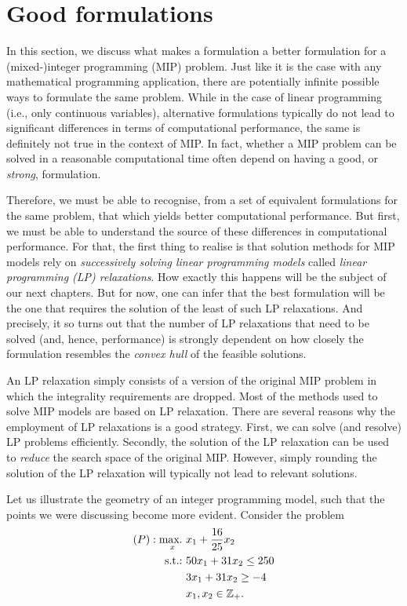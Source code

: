   
\section{Good formulations}

In this section, we discuss what makes a formulation a better formulation for a (mixed-)integer programming (MIP) problem. Just like it is the case with any mathematical programming application, there are potentially infinite possible ways to formulate the same problem. While in the case of linear programming (i.e., only continuous variables), alternative formulations typically do not lead to significant differences in terms of computational performance, the same is definitely not true in the context of MIP. In fact, whether a MIP problem can be solved in a reasonable computational time often depend on having a good, or \emph{strong}, formulation.

Therefore, we must be able to recognise, from a set of equivalent formulations for the same problem, that which yields better computational performance. But first, we must be able to understand the source of these differences in computational performance. For that, the first thing to realise is that solution methods for MIP models rely on \emph{successively solving linear programming models} called \emph{linear programming (LP) relaxations}. How exactly this happens will be the subject of our next chapters. But for now, one can infer that the best formulation will be the one that requires the solution of the least of such LP relaxations. And precisely, it so turns out that the number of LP relaxations that need to be solved (and, hence, performance) is strongly dependent on how closely the formulation resembles the \emph{convex hull} of the feasible solutions.

An LP relaxation simply consists of a version of the original MIP problem in which the integrality requirements are dropped. Most of the methods used to solve MIP models are based on LP relaxation. There are several reasons why the employment of LP relaxations is a good strategy. First, we can solve (and resolve) LP problems efficiently. Secondly, the solution of the LP relaxation can be used to \emph{reduce} the search space of the original MIP. However, simply rounding the solution of the LP relaxation will typically not lead to relevant solutions.

Let us illustrate the geometry of an integer programming model, such that the points we were discussing become more evident. Consider the problem
%
\begin{align*}
	(P): \mathop{\text{max.~}}_x &x_1 + \frac{16}{25}x_2 \\
	\mathop{\text{s.t.:~}} &50x_1 + 31x_2 \leq 250\\
	&3x_1 + 31x_2 \geq -4\\
	&x_1, x_2 \in \mathbb{Z}_+.
\end{align*}
 
